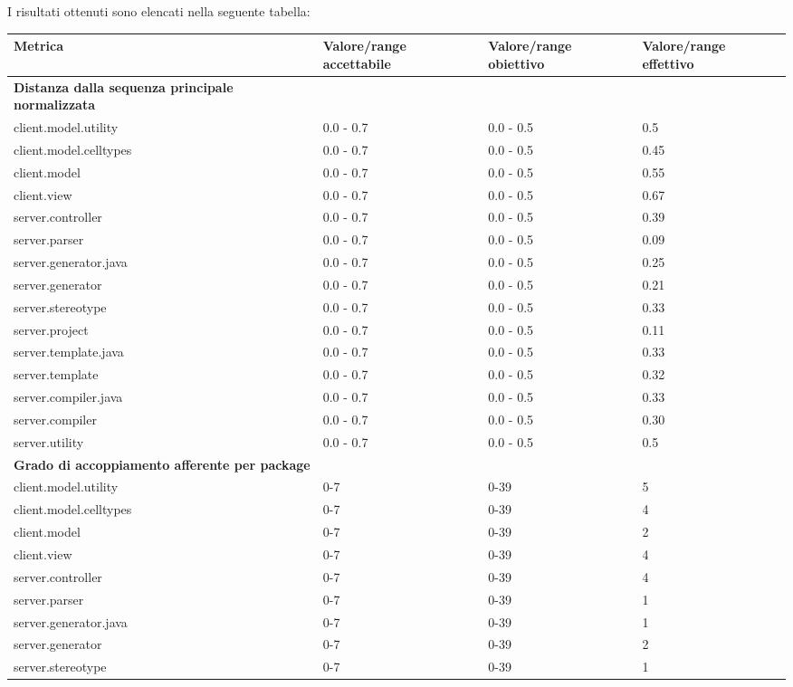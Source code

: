 		I risultati ottenuti sono elencati nella seguente tabella:
		\begin{longtable}{|p{5.5cm}|p{2.25cm}|p{2.25cm}|p{2.25cm}|}
		\hline
		\textbf{Metrica} 		 					&\textbf{Valore/range accettabile}	&\textbf{Valore/range obiettivo}	&\textbf{Valore/range effettivo}\\
		\hline
		\textbf{Distanza dalla sequenza principale normalizzata} & & &\\
		client.model.utility &0.0 - 0.7 &0.0 - 0.5 &0.5\\
		client.model.celltypes &0.0 - 0.7 &0.0 - 0.5 &0.45\\
		client.model &0.0 - 0.7 &0.0 - 0.5 &0.55\\
		client.view &0.0 - 0.7 &0.0 - 0.5 &0.67\\
		server.controller &0.0 - 0.7 &0.0 - 0.5 &0.39\\
		server.parser  &0.0 - 0.7 &0.0 - 0.5 &0.09\\
		server.generator.java  &0.0 - 0.7 &0.0 - 0.5 &0.25\\
		server.generator &0.0 - 0.7 &0.0 - 0.5 &0.21\\
		server.stereotype  &0.0 - 0.7 &0.0 - 0.5 &0.33\\
		server.project  &0.0 - 0.7 &0.0 - 0.5 &0.11\\
		server.template.java  &0.0 - 0.7 &0.0 - 0.5 &0.33\\
		server.template  &0.0 - 0.7 &0.0 - 0.5 &0.32\\
		server.compiler.java  &0.0 - 0.7 &0.0 - 0.5 &0.33\\
		server.compiler  &0.0 - 0.7 &0.0 - 0.5 &0.30\\
		server.utility  &0.0 - 0.7 &0.0 - 0.5 &0.5\\
		\hline
		\textbf{Grado di accoppiamento afferente per package} & & &\\
		client.model.utility &0-7 &0-39 &5\\
		client.model.celltypes &0-7 &0-39 &4\\
		client.model &0-7 &0-39 &2\\
		client.view &0-7 &0-39 &4\\
		server.controller &0-7 &0-39 &4\\
		server.parser  &0-7 &0-39 &1\\
		server.generator.java  &0-7 &0-39 &1\\
		server.generator &0-7 &0-39 &2\\
		server.stereotype  &0-7 &0-39 &1\\

\end{longtable}
